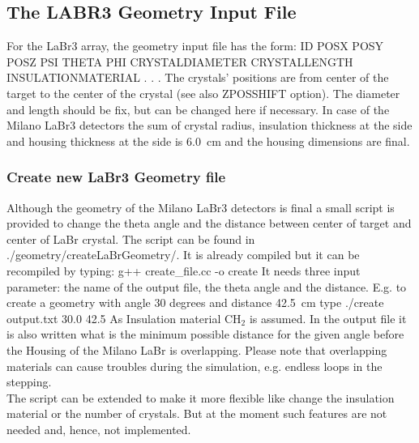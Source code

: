 \documentclass[12pt]{book}
\begin{document}
\subsection{The LABR3 Geometry Input File}

For the LaBr3 array, the geometry input file has the form:\hfill{} 
\linebreak
\linebreak
{\ttfamily ID POSX POSY POSZ PSI THETA PHI CRYSTALDIAMETER CRYSTALLENGTH INSULATIONMATERIAL}\linebreak
{\ttfamily .}\linebreak
{\ttfamily .}\linebreak
{\ttfamily .}\linebreak
\linebreak
\linebreak
The crystals' positions are from center of the target to the center of the crystal (see also ZPOSSHIFT option). The diameter and length should be fix, but can be changed here if necessary. In case of the Milano LaBr3 detectors the sum of crystal radius, insulation thickness at the side and housing thickness at the side is 6.0~cm and the housing dimensions are final.

\subsubsection{Create new LaBr3 Geometry file}

Although the geometry of the Milano LaBr3 detectors is final a small script is provided to change the theta angle and the distance between center of target and center of LaBr crystal. The script can be found in {\ttfamily ./geometry/createLaBrGeometry/}. It is already compiled but it can be recompiled by typing:\hfill{}
\linebreak
\linebreak
{\ttfamily g++ create\_file.cc -o create}
\linebreak
\linebreak
It needs three input parameter: the name of the output file, the theta angle and the distance. E.g. to create a geometry with angle 30 degrees and distance 42.5~cm type\hfill{}
\linebreak
\linebreak
{\ttfamily ./create output.txt 30.0 42.5}
\linebreak
\linebreak
As Insulation material CH$_2$ is assumed. 
In the output file it is also written what is the minimum possible distance for the given angle before the Housing of the Milano LaBr is overlapping. Please note that overlapping materials can cause troubles during the simulation, e.g. endless loops in the stepping.\\
The script can be extended to make it more flexible like change the insulation material or the number of crystals. But at the moment such features are not needed and, hence, not implemented.
\end{document}
